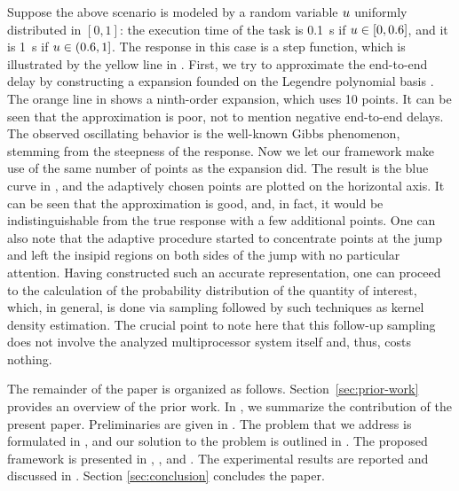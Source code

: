 Suppose the above scenario is modeled by a random variable $u$ uniformly
distributed in $[0, 1]$: the execution time of the task is 0.1~s if $u \in [0,
0.6]$, and it is 1~s if $u \in (0.6, 1]$. The response in this case is a step
function, which is illustrated by the yellow line in . First,
we try to approximate the end-to-end delay by constructing a  expansion
founded on the Legendre polynomial basis \cite{xiu2010}. The orange line in
 shows a ninth-order  expansion, which uses 10 points.
It can be seen that the approximation is poor, not to mention negative
end-to-end delays. The observed oscillating behavior is the well-known Gibbs
phenomenon, stemming from the steepness of the response. Now we let our
framework make use of the same number of points as the  expansion did.
The result is the blue curve in , and the adaptively chosen
points are plotted on the horizontal axis. It can be seen that the approximation
is good, and, in fact, it would be indistinguishable from the true response with
a few additional points. One can also note that the adaptive procedure started
to concentrate points at the jump and left the insipid regions on both sides of
the jump with no particular attention. Having constructed such an accurate
representation, one can proceed to the calculation of the probability
distribution of the quantity of interest, which, in general, is done via
sampling followed by such techniques as kernel density estimation. The crucial
point to note here that this follow-up sampling does not involve the analyzed
multiprocessor system itself and, thus, costs nothing.

The remainder of the paper is organized as follows. Section~\ref{sec:prior-work}
provides an overview of the prior work. In , we summarize the
contribution of the present paper. Preliminaries are given in
. The problem that we address is formulated in
, and our solution to the problem is outlined in
. The proposed framework is presented in ,
, and . The experimental results are reported
and discussed in . Section \ref{sec:conclusion}
concludes the paper.
